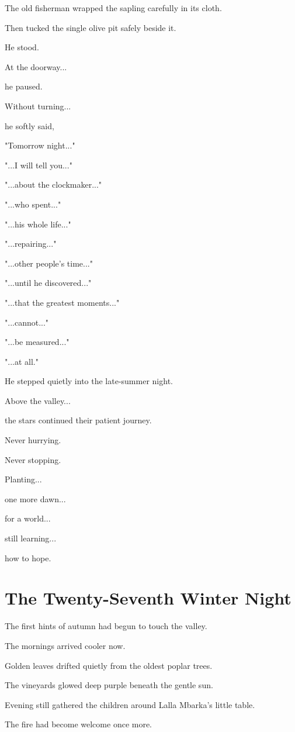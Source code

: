 \documentclass[12pt,openany]{book}
\begin{document}
The old fisherman wrapped the sapling carefully in its cloth.

Then tucked the single olive pit safely beside it.

He stood.

At the doorway...

he paused.

Without turning...

he softly said,

"Tomorrow night..."

"...I will tell you..."

"...about the clockmaker..."

"...who spent..."

"...his whole life..."

"...repairing..."

"...other people's time..."

"...until he discovered..."

"...that the greatest moments..."

"...cannot..."

"...be measured..."

"...at all."

He stepped quietly into the late-summer night.

Above the valley...

the stars continued their patient journey.

Never hurrying.

Never stopping.

Planting...

one more dawn...

for a world...

still learning...

how to hope.
\chapter{The Twenty-Seventh Winter Night}

The first hints of autumn had begun to touch the valley.

The mornings arrived cooler now.

Golden leaves drifted quietly from the oldest poplar trees.

The vineyards glowed deep purple beneath the gentle sun.

Evening still gathered the children around Lalla Mbarka's little table.

The fire had become welcome once more.
\end{document}

